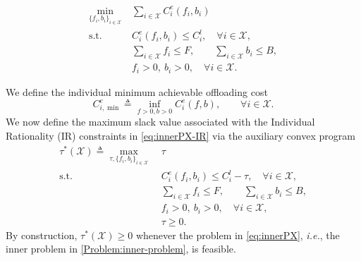 \documentclass[lettersize,journal]{IEEEtran}
\newcommand{\ie}{\emph{i.e.}}
\begin{document}
\begin{align}\label{eq:innerPX}
\min_{\{f_i,b_i\}_{i\in \mathcal{X}}} \ & \sum_{i\in \mathcal{X}} C_i^e(f_i,b_i)\\
\text{s.t.}\quad
& C_i^e(f_i,b_i)\le C_i^l,\quad \forall i\in \mathcal{X},\label{eq:innerPX-IR}\\
& \sum_{i\in \mathcal{X}} f_i \le F,\qquad \sum_{i\in \mathcal{X}} b_i \le B,\\
& f_i>0,\ b_i>0,\quad \forall i\in \mathcal{X}.
\end{align}

We define the individual minimum achievable offloading cost
\begin{equation}
\label{eq:Ci_min}
C_{i,\min}^e \triangleq \inf_{f>0,b>0} C_i^e(f,b),\qquad \forall i\in \mathcal{X}.
\end{equation}
We now define the maximum slack value associated with the Individual Rationality (IR) constraints in \eqref{eq:innerPX-IR} via the auxiliary convex program
\begin{equation}
\label{eq:slackMax}
\begin{aligned}
\tau^*(\mathcal{X}) \triangleq \max_{\tau,\{f_i,b_i\}_{i\in \mathcal{X}}} \ & \tau\\
\text{s.t.}\quad
& C_i^e(f_i,b_i) \le C_i^l-\tau,\quad \forall i\in \mathcal{X},\\
& \sum_{i\in \mathcal{X}} f_i \le F,\qquad \sum_{i\in \mathcal{X}} b_i \le B,\\
& f_i>0,\ b_i>0,\quad \forall i\in \mathcal{X},\\
& \tau \ge 0.
\end{aligned}
\end{equation}
By construction, $\tau^*(\mathcal{X})\ge 0$ whenever the problem in \eqref{eq:innerPX}, \ie, the inner problem in \eqref{Problem:inner-problem}, is feasible.
\end{document}
